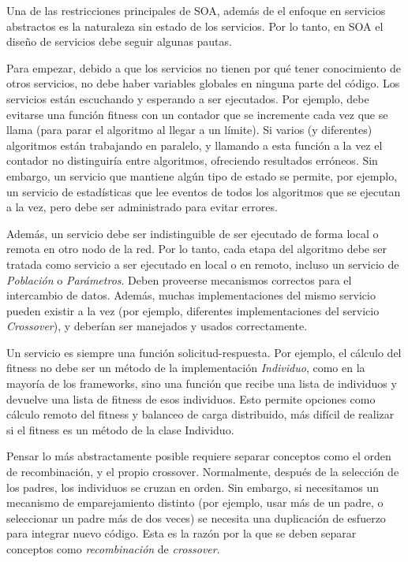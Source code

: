 \documentclass[runningheads]{llncs}
\begin{document}
Una de las restricciones principales de SOA, además de el enfoque en servicios abstractos es la naturaleza sin estado de los servicios. Por lo tanto, en SOA el diseño de servicios debe seguir algunas pautas.

Para empezar, debido a que los servicios no tienen por qué tener conocimiento de otros servicios, no debe haber variables globales en ninguna parte del código. Los servicios están escuchando y esperando a ser ejecutados. Por ejemplo, debe evitarse una función fitness con un contador que se incremente cada vez que se llama (para parar el algoritmo al llegar a un límite). Si varios (y diferentes) algoritmos están trabajando en paralelo, y llamando a esta función a la vez el contador no distinguiría entre algoritmos, ofreciendo resultados erróneos. Sin embargo, un servicio que mantiene algún tipo de estado se permite, por ejemplo, un servicio de estadísticas que lee eventos de todos los algoritmos que se ejecutan a la vez, pero debe ser administrado para evitar errores.

Además, un servicio debe ser indistinguible de ser ejecutado de forma local o remota en otro nodo de la red. Por lo tanto, cada etapa del algoritmo debe ser tratada como servicio a ser ejecutado en local o en remoto, incluso un servicio de {\em Población} o {\em Parámetros}. Deben proveerse mecanismos correctos para el intercambio de datos. Además, muchas implementaciones del mismo servicio pueden existir a la vez (por ejemplo, diferentes implementaciones del servicio {\em Crossover}), y deberían ser manejados y usados correctamente.

Un servicio es siempre una función solicitud-respuesta. Por ejemplo, el cálculo del fitness no debe ser un método de la implementación {\em Individuo},  como en la mayoría de los frameworks, sino una función que recibe una lista de individuos y devuelve una lista de fitness de esos individuos. Esto permite opciones como cálculo remoto del fitness y balanceo de carga distribuido, más difícil de realizar si el fitness es un método de la clase Individuo.

Pensar lo más abstractamente posible requiere separar conceptos como el orden de recombinación, y el propio crossover. Normalmente, después de la selección de los padres, los individuos se cruzan en orden. Sin embargo, si necesitamos un mecanismo de emparejamiento distinto (por ejemplo, usar más de un padre, o seleccionar un padre más de dos veces) se necesita una duplicación de esfuerzo para integrar nuevo código. Esta es la razón por la que se deben separar conceptos como {\em recombinación} de {\em crossover}. 
\end{document}
